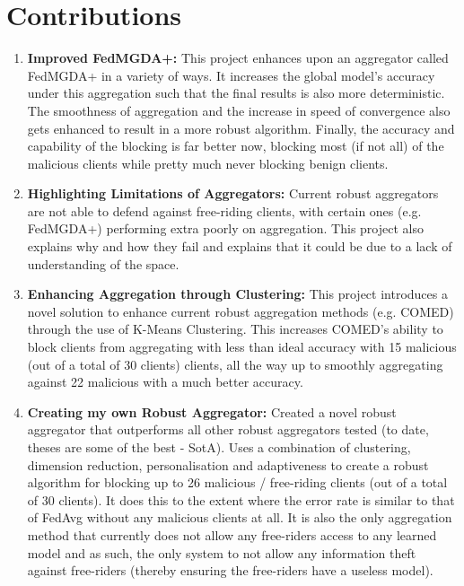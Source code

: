\section{Contributions}
\begin{enumerate}
    \item \textbf{Improved FedMGDA+:} 
    This project enhances upon an aggregator called FedMGDA+ in a variety of ways.
    It increases the global model's accuracy under this aggregation such that the final results is also more deterministic.
    The smoothness of aggregation and the increase in speed of convergence also gets enhanced to result in a more robust algorithm.
    Finally, the accuracy and capability of the blocking is far better now, blocking most (if not all) of the malicious clients while pretty much never blocking benign clients.
    
    \item \textbf{Highlighting Limitations of Aggregators:}
    Current robust aggregators are not able to defend against free-riding clients, with certain ones (e.g. FedMGDA+) performing extra poorly on aggregation.
    This project also explains why and how they fail and explains that it could be due to a lack of understanding of the space.
    
    \item \textbf{Enhancing Aggregation through Clustering:}
    This project introduces a novel solution to enhance current robust aggregation methods (e.g. COMED) through the use of K-Means Clustering.
    This increases COMED's ability to block clients from aggregating with less than ideal accuracy with 15 malicious (out of a total of 30 clients) clients, all the way up to smoothly aggregating against 22 malicious with a much better accuracy.
    
    \item \textbf{Creating my own Robust Aggregator:}
    Created a novel robust aggregator that outperforms all other robust aggregators tested (to date, theses are some of the best - SotA).
    Uses a combination of clustering, dimension reduction, personalisation and adaptiveness to create a robust algorithm for blocking up to 26 malicious / free-riding clients (out of a total of 30 clients).
    It does this to the extent where the error rate is similar to that of FedAvg without any malicious clients at all.
    It is also the only aggregation method that currently does not allow any free-riders access to any learned model and as such, the only system to not allow any information theft against free-riders (thereby ensuring the free-riders have a useless model).
    

\end{enumerate}
